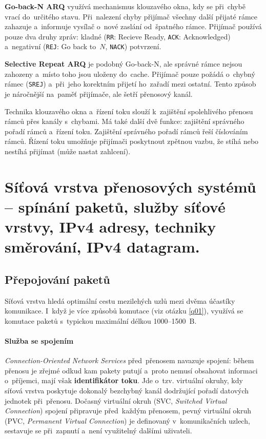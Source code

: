 \textbf{Go-back-N ARQ} využívá mechanismus klouzavého okna, kdy se při~chybě vrací do~určitého stavu. Při~nalezení chyby přijímač všechny další přijaté rámce zahazuje a~informuje vysílač o~nové zaslání od~špatného rámce. Přijímač používá pouze dva druhy zpráv: kladné (\texttt{RR}: Recieve Ready, \texttt{ACK}: Acknowledged) a~negativní (\texttt{REJ}: Go back to~$N$, \texttt{NACK}) potvrzení.

\textbf{Selective Repeat ARQ} je podobný Go-back-N, ale správné rámce nejsou zahozeny a~místo toho jsou uloženy do~cache. Přijímač pouze požádá o~chybný rámec (\texttt{SREJ}) a~při~jeho korektním přijetí ho~zařadí mezi ostatní. Tento způsob je náročnější na~paměť přijímače, ale šetří přenosový kanál.

Technika klouzavého okna a~řízení toku slouží k~zajištění spolehlivého přenosu rámců přes kanály s~chybami. Má také další dvě funkce: zajištění správného pořadí rámců a~řízení toku. Zajištění správného pořadí rámců řeší číslováním rámců. Řízení toku umožňuje přijímači poskytnout zpětnou vazbu, že stíhá nebo nestíhá přijímat (může nastat zahlcení).


\clearpage
\section{Síťová vrstva přenosových systémů -- spínání paketů, služby síťové vrstvy, IPv4 adresy, techniky směrování, IPv4 datagram.}

\subsection{Přepojování paketů}

Síťová vrstva hledá optimální cestu mezilehých uzlů mezi dvěma účastíky komunikace. I~když je více způsobů komutace (viz otázku \ref{q01}), využívá se komutace paketů s~typickou maximální délkou 1000--1500~B.

\paragraph{Služba se spojením} \emph{Connection-Oriented Network Services} před~přenosem navazuje spojení: během přenosu je zřejmé odkud kam pakety putují a~proto nemusí obsahovat informaci o~příjemci, mají však \textbf{identifikátor toku}. Jde o~tzv. virtuální okruhy, kdy síťová vrstva poskytuje dokonalý bezchybný kanál dodržující pořadí datových jednotek při~přenosu. Dočasný virtuální okruh (SVC, \emph{Switched Virtual Connection}) spojení připravuje před~každým přenosem, pevný virtuální okruh (PVC, \emph{Permanent Virtual Connection}) je definovaný v~komunikačních uzlech, sestavuje se při~zapnutí a~není využitelný dalšími uživateli.

